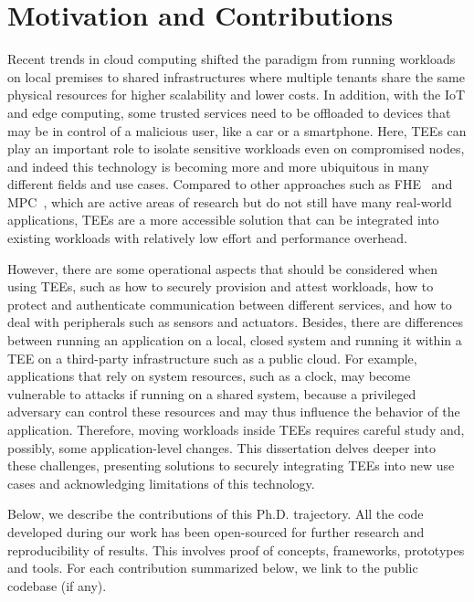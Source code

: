 \section{Motivation and Contributions}
\label{thesis:intro-motivation}

Recent trends in cloud computing shifted the paradigm from running workloads on
local premises to shared infrastructures where multiple tenants share the same
physical resources for higher scalability and lower costs. In addition, with the
\acl{IoT} and edge computing, some trusted services need to be offloaded to
devices that may be in control of a malicious user, like a car or a smartphone.
Here, \acp{TEE} can play an important role to isolate sensitive workloads even
on compromised nodes, and indeed this technology is becoming more and more
ubiquitous in many different fields and use cases. Compared to other approaches
such as \ac{FHE}~\cite{acar2018fhe} and \ac{MPC}~\cite{lindell2020mpc}, which
are active areas of research but do not still have many real-world applications,
\acp{TEE} are a more accessible solution that can be integrated into existing
workloads with relatively low effort and performance overhead.

However, there are some operational aspects that should be considered when using
\acp{TEE}, such as how to securely provision and attest workloads, how to
protect and authenticate communication between different services, and how to
deal with peripherals such as sensors and actuators. Besides, there are
differences between running an application on a local, closed system and running
it within a \ac{TEE} on a third-party infrastructure such as a public cloud. For
example, applications that rely on system resources, such as a clock, may become
vulnerable to attacks if running on a shared system, because a privileged
adversary can control these resources and may thus influence the behavior of the
application. Therefore, moving workloads inside \acp{TEE} requires careful study
and, possibly, some application-level changes. This dissertation delves deeper
into these challenges, presenting solutions to securely integrating \acp{TEE}
into new use cases and acknowledging limitations of this technology.


Below, we describe the contributions of this Ph.D. trajectory. All the code
developed during our work has been open-sourced for further research and
reproducibility of results. This involves proof of concepts, frameworks,
prototypes and tools. For each contribution summarized below, we link to the
public codebase (if any).
